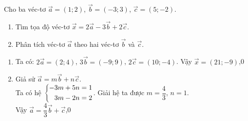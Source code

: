 \begin{ex}%
Cho ba véc-tơ $\vec{a}=(1;2)$, $\vec{b}=(-3;3)$, $\vec{c}=(5;-2)$.
\begin{enumerate}
\item Tìm tọa độ véc-tơ $\vec{x}=2\vec{a}-3\vec{b}+2\vec{c}$.
\item Phân tích véc-tơ $\vec{a}$ theo hai véc-tơ $\vec{b}$ và $\vec{c}$.
\end{enumerate}
\loigiai
{ \begin{enumerate}
	\item Ta có: $2\vec{a}=(2;4)$, $3\vec{b}=(-9;9)$, $2\vec{c}=(10;-4)$. Vậy $\vec{x}=(21;-9)$,0
	\item Giả sử $\vec{a}=m\vec{b}+n\vec{c}$. \\Ta có hệ $\left\{\begin{aligned}-3m+5n=1\\3m-2n=2\end{aligned}\right.$. Giải hệ ta được $m=\dfrac{4}{3}$, $n=1$. \\Vậy $\vec{a}=\dfrac{4}{3}\vec{b}+\vec{c}$,0
\end{enumerate}}
\end{ex}
